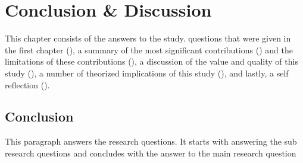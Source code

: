 \chapter{Conclusion \& Discussion}
\label{chap:conclusion}



This chapter consists of the answers to the study.
questions that were given in the first chapter (), 
a summary of the most significant contributions () and the limitations of these contributions (), 
a discussion of the value and quality of this study (),
a number of theorized implications of this study (),
and lastly, a self reflection ().





\section{Conclusion}
\label{sec:conclusion}

This paragraph answers the research questions. 
It starts with answering the sub research questions and concludes with the answer to the main research question

